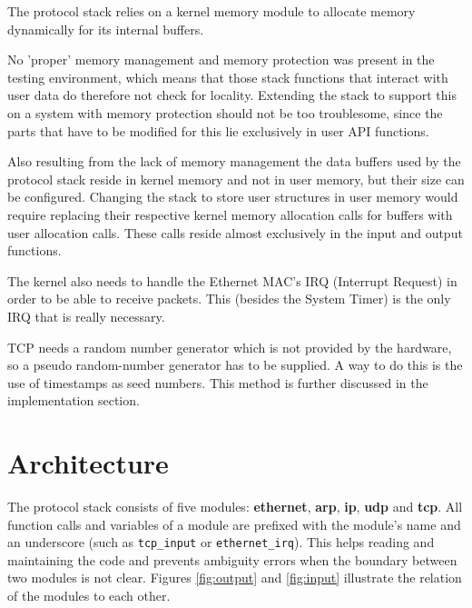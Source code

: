 \documentclass[11pt,twoside,abstract,notitlepage]{scrreprt}
\begin{document}
The protocol stack relies on a kernel memory module to allocate memory dynamically for its internal buffers. 

No 'proper' memory management and memory protection was present in the testing environment, which means that those stack functions that interact with user data do therefore not check for locality. Extending the stack to support this on a system with memory protection should not be too troublesome, since the parts that have to be modified for this lie exclusively in user API functions. 

Also resulting from the lack of memory management the data buffers used by the protocol stack reside in kernel memory and not in user memory, but their size can be configured. Changing the stack to store user structures in user memory would require replacing their respective kernel memory allocation calls for buffers with user allocation calls. These calls reside almost exclusively in the input and output functions.

The kernel also needs to handle the Ethernet MAC's IRQ (Interrupt Request) in order to be able to receive packets. This (besides the System Timer) is the only IRQ that is really necessary. 

TCP needs a random number generator which is not provided by the hardware, so a pseudo random-number generator has to be supplied. A way to do this is the use of timestamps as seed numbers. This method is further discussed in the implementation section.

\section{Architecture}
The protocol stack consists of five modules: \textbf{ethernet}, \textbf{arp}, \textbf{ip}, \textbf{udp} and \textbf{tcp}. All function calls and variables of a module are prefixed with the module's name and an underscore (such as \texttt{tcp\_input} or \texttt{ethernet\_irq}). This helps reading and maintaining the code and prevents ambiguity errors when the boundary between two modules is not clear. Figures \ref{fig:output} and \ref{fig:input} illustrate the relation of the modules to each other. 
\end{document}
